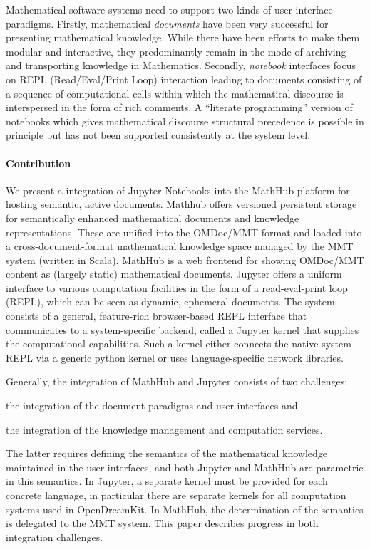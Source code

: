 Mathematical software systems need to support two kinds of user interface paradigms.
Firstly, mathematical \emph{documents} have been very successful for presenting mathematical knowledge.
While there have been efforts to make them modular and interactive, they predominantly remain in the mode of archiving and transporting knowledge in Mathematics.
Secondly, \emph{notebook} interfaces focus on REPL (Read/Eval/Print Loop) interaction leading to documents consisting of a sequence of computational cells within which the mathematical discourse is interspersed in the form of rich comments.
A ``literate programming'' version of notebooks which gives mathematical discourse structural precedence is possible in principle but has not been supported consistently at the system level.

\paragraph{Contribution} We present a integration of Jupyter Notebooks into the MathHub platform for hosting semantic, active documents.
Mathhub offers versioned persistent storage for semantically enhanced mathematical documents and knowledge representations.
These are unified into the OMDoc/MMT format and loaded into a cross-document-format mathematical knowledge space managed by the MMT system (written in Scala).  
MathHub is a web frontend for showing OMDoc/MMT content as (largely static) mathematical documents.
Jupyter offers a uniform interface to various computation facilities in the form of a read-eval-print loop (REPL), which can be seen as dynamic, ephemeral documents.
The system consists of a general, feature-rich browser-based REPL interface that communicates to a system-specific backend, called a Jupyter kernel that supplies the computational capabilities.
Such a kernel either connects the native system REPL via a generic python kernel or uses language-specific network libraries. 

Generally, the integration of MathHub and Jupyter consists of two challenges:
\begin{compactenum}[\em i\rm )]
\item the integration of the document paradigms and user interfaces 
and
\item the integration of the knowledge management and computation services.
\end{compactenum}
The latter requires defining the semantics of the mathematical knowledge maintained in the user interfaces, and both Jupyter and MathHub are parametric in this semantics.
In Jupyter, a separate kernel must be provided for each concrete language, in particular there are separate kernels for all computation systems used in OpenDreamKit.
In MathHub, the determination of the semantics is delegated to the MMT system. This paper describes progress in both integration challenges.

